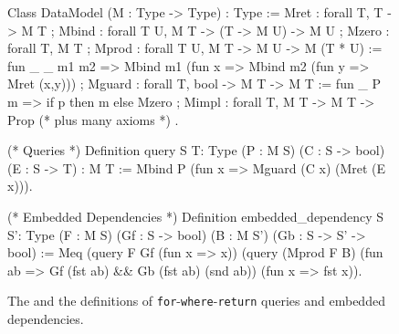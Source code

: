 \documentclass[preprint]{sigplanconf}
\begin{document}
\begin{figure}[t]
\label{fig:chaseable-functor}
\begin{coq}
Class DataModel (M : Type -> Type) : Type :=
{ Mret  : forall {T}, T -> M T
; Mbind : forall {T U}, M T -> (T -> M U) -> M U
; Mzero : forall {T}, M T
; Mprod : forall {T U}, M T -> M U -> M (T * U) :=
     fun _ _ m1 m2 => Mbind m1 (fun x => Mbind m2 (fun y => Mret (x,y)))
; Mguard : forall {T}, bool -> M T -> M T :=
     fun _ P m => if p then m else Mzero
; Mimpl : forall {T}, M T -> M T -> Prop
 (* plus many axioms *)
}.

(* Queries *)
Definition query {S T: Type}
  (P : M S) (C : S -> bool) (E : S -> T) : M T :=
  Mbind P (fun x => Mguard (C x) (Mret (E x))).

(* Embedded Dependencies *)
Definition embedded_dependency {S S': Type}
  (F : M S) (Gf : S -> bool) (B : M S') (Gb : S -> S' -> bool)
:= Meq (query F Gf (fun x => x))
       (query (Mprod F B)
              (fun ab => Gf (fst ab) && Gb (fst ab) (snd ab))
              (fun x => fst x)).
\end{coq}






\caption{The  and the definitions of {\tt for}-{\tt where}-{\tt return} queries and embedded dependencies.}
\label{fig:chaseable-functor}
\end{figure}
\end{document}
